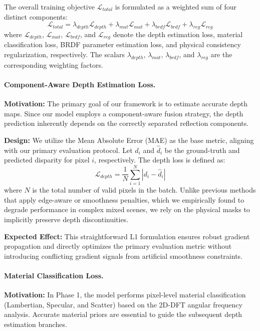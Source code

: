 \documentclass[lettersize,journal]{IEEEtran}
\begin{document}
The overall training objective $\mathcal{L}_{total}$ is formulated as a weighted sum of four distinct components:
\begin{equation}
\label{eq:eq18}
\mathcal{L}_{total} = \lambda_{depth} \mathcal{L}_{depth} + \lambda_{mat} \mathcal{L}_{mat} + \lambda_{brdf} \mathcal{L}_{brdf} + \lambda_{reg} \mathcal{L}_{reg}
\end{equation}
where $\mathcal{L}_{depth}$, $\mathcal{L}_{mat}$, $\mathcal{L}_{brdf}$, and $\mathcal{L}_{reg}$ denote the depth estimation loss, material classification loss, BRDF parameter estimation loss, and physical consistency regularization, respectively. The scalars $\lambda_{depth}$, $\lambda_{mat}$, $\lambda_{brdf}$, and $\lambda_{reg}$ are the corresponding weighting factors.

\paragraph{Component-Aware Depth Estimation Loss.}
\textbf{Motivation:} The primary goal of our framework is to estimate accurate depth maps. Since our model employs a component-aware fusion strategy, the depth prediction inherently depends on the correctly separated reflection components. 

\textbf{Design:} We utilize the Mean Absolute Error (MAE) as the base metric, aligning with our primary evaluation protocol. Let $d_i$ and $\hat{d}_i$ be the ground-truth and predicted disparity for pixel $i$, respectively. The depth loss is defined as:
\begin{equation}
\label{eq:eq19}
\mathcal{L}_{depth} = \frac{1}{N} \sum_{i=1}^{N} | d_i - \hat{d}_i |
\end{equation}
where $N$ is the total number of valid pixels in the batch. Unlike previous methods that apply edge-aware or smoothness penalties, which we empirically found to degrade performance in complex mixed scenes, we rely on the physical masks to implicitly preserve depth discontinuities.

\textbf{Expected Effect:} This straightforward L1 formulation ensures robust gradient propagation and directly optimizes the primary evaluation metric without introducing conflicting gradient signals from artificial smoothness constraints.

\paragraph{Material Classification Loss.}
\textbf{Motivation:} In Phase 1, the model performs pixel-level material classification (Lambertian, Specular, and Scatter) based on the 2D-DFT angular frequency analysis. Accurate material priors are essential to guide the subsequent depth estimation branches.
\end{document}
